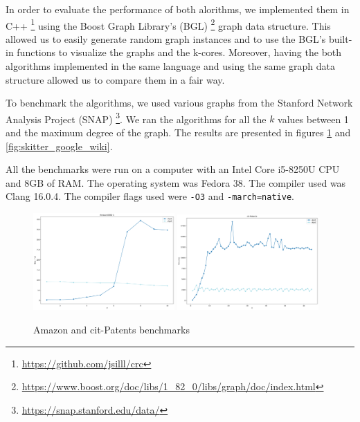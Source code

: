 \label{Evaluation}

In order to evaluate the performance of both alorithms, we implemented them in C++ \footnote{\url{https://github.com/jsilll/crc}} using the Boost Graph Library's (BGL) \footnote{\url{https://www.boost.org/doc/libs/1_82_0/libs/graph/doc/index.html}} graph data structure. This allowed us to easily generate random graph instances and to use the BGL's built-in functions to visualize the graphs and the k-cores. Moreover, having the both algorithms implemented in the same language and using the same graph data structure allowed us to compare them in a fair way.

To benchmark the algorithms, we used various graphs from the Stanford Network Analysis Project (SNAP) \footnote{\url{https://snap.stanford.edu/data/}}. We ran the algorithms for all the $k$ values between 1 and the maximum degree of the graph. The results are presented in figures \ref{fig:Amazon_CitPatents} and \ref{fig:skitter_google_wiki}.

All the benchmarks were run on a computer with an Intel Core i5-8250U CPU and 8GB of RAM. The operating system was Fedora 38. The compiler used was Clang 16.0.4. The compiler flags used were \texttt{-O3} and \texttt{-march=native}.
\begin{figure}[H]
    \centering
    \includegraphics[width=0.48\textwidth]{Figures/Amazon0302-1.png}
    \includegraphics[width=0.48\textwidth]{Figures/cit-Patents.png}
    \caption{Amazon and cit-Patents benchmarks}
    \label{fig:Amazon_CitPatents}
\end{figure}

